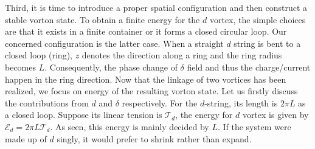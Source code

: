 \documentclass[12pt]{article}
\begin{document}
Third, it is time to introduce a proper spatial configuration and then
construct a stable vorton state.
To obtain a finite energy for the $d$ vortex, the simple choices are that it exists in a finite
container or it forms a closed circular loop.
Our concerned configuration is the latter case. When a straight $d$ string is bent to a
closed loop (ring), $z$ denotes the direction along a ring and the ring radius becomes $L$.
Consequently, the phase change of $\delta$ field and thus the charge/current happen in
the ring direction. 
Now that the linkage of two vortices has been realized, we focus on energy of the resulting vorton state.
Let us firstly discuss the contributions from $d$ and
$\delta$ respectively. For the $d$-string, its length is $2 \pi L$ as a closed loop.
Suppose its linear tension is $\mathcal{T}_d$, the energy for $d$ vortex is given by
$\mathcal{E}_d = 2\pi L \mathcal{T}_d$. As seen, this energy is mainly decided by $L$. 
If the system were made up of $d$ singly, it would prefer to shrink
rather than expand.
\end{document}
